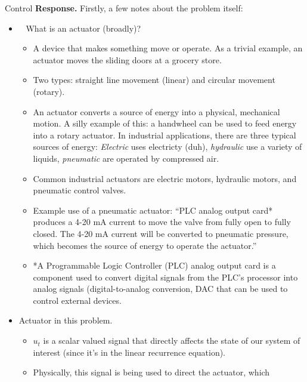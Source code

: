\begin{chapter}{Control}
    \vspace{.1cm}
    \noindent \textbf{Response.}
        Firstly, a few notes about the problem itself:
        \begin{itemize}
            \item ~\cite*{actuator_youtube} What is an actuator (broadly)?
                \begin{itemize}
                    \item A device that makes something move or operate.
                    As a trivial example, an actuator moves the sliding doors at a grocery store.
                    \item Two types: straight line movement (linear) and circular movement (rotary).
                    \item An actuator converts a source of energy into a physical, mechanical motion.
                    A silly example of this: a handwheel can be used to feed energy into a rotary actuator.
                    In industrial applications, there are three typical sources of energy: \textit{Electric} uses electricty (duh),
                    \textit{hydraulic} use a variety of liquids, \textit{pneumatic} are operated by compressed air.
                    \item Common industrial actuators are electric motors, hydraulic motors, and pneumatic control valves.
                    \item Example use of a pneumatic actuator: ``PLC analog output card* produces a 4-20 mA current to move the 
                    valve from fully open to fully closed. The 4-20 mA current will be converted to pneumatic pressure, which
                    becomes the source of energy to operate the actuator.''
                    \item *A Programmable Logic Controller (PLC) analog output card is a component
                    used to convert digital signals from the PLC's processor into analog signals (digital-to-analog conversion, DAC that can
                    be used to control external devices.
                \end{itemize}
            \item Actuator in this problem.
                \begin{itemize}
                    \item $u_t$ is a scalar valued signal that directly affects the state
                    of our system of interest (since it's in the linear recurrence equation).
                    \item Physically, this signal is being used to direct the actuator, which

\end{itemize}
\end{itemize}
\end{chapter}
